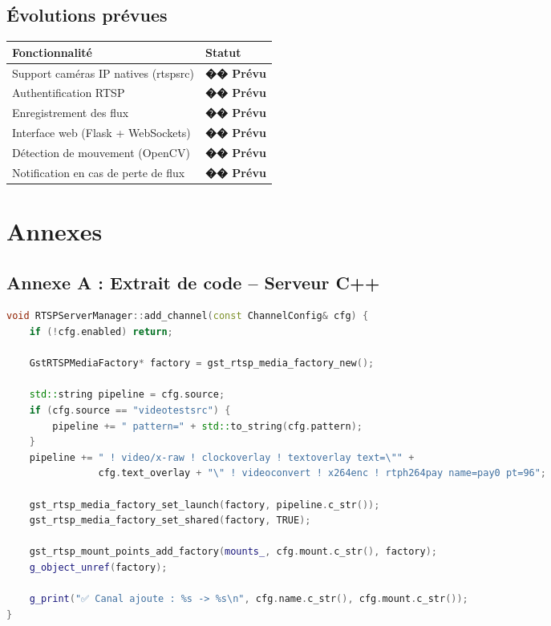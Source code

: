 \documentclass[12pt,a4paper]{report}
\newcommand{\warning}[1]{\textcolor{accentOrange}{\textbf{#1}}}
\begin{document}
\section{Évolutions prévues}

\begin{table}[H]
    \centering
    \begin{tabular}{|l|l|}
        \hline
        \rowcolor{primaryBlue!80}
        \color{white}\textbf{Fonctionnalité} & \color{white}\textbf{Statut} \\
        \hline
        Support caméras IP natives (rtspsrc) & \warning{�� Prévu} \\
        Authentification RTSP & \warning{�� Prévu} \\
        Enregistrement des flux & \warning{�� Prévu} \\
        Interface web (Flask + WebSockets) & \warning{�� Prévu} \\
        Détection de mouvement (OpenCV) & \warning{�� Prévu} \\
        Notification en cas de perte de flux & \warning{�� Prévu} \\
        \hline
    \end{tabular}
\end{table}

\chapter*{Annexes}

\section*{Annexe A : Extrait de code – Serveur C++}

\begin{lstlisting}[language=c++, caption=RTSPServerManager.cpp]
void RTSPServerManager::add_channel(const ChannelConfig& cfg) {
    if (!cfg.enabled) return;
    
    GstRTSPMediaFactory* factory = gst_rtsp_media_factory_new();
    
    std::string pipeline = cfg.source;
    if (cfg.source == "videotestsrc") {
        pipeline += " pattern=" + std::to_string(cfg.pattern);
    }
    pipeline += " ! video/x-raw ! clockoverlay ! textoverlay text=\"" + 
                cfg.text_overlay + "\" ! videoconvert ! x264enc ! rtph264pay name=pay0 pt=96";
    
    gst_rtsp_media_factory_set_launch(factory, pipeline.c_str());
    gst_rtsp_media_factory_set_shared(factory, TRUE);
    
    gst_rtsp_mount_points_add_factory(mounts_, cfg.mount.c_str(), factory);
    g_object_unref(factory);
    
    g_print("✅ Canal ajoute : %s -> %s\n", cfg.name.c_str(), cfg.mount.c_str());
}
\end{lstlisting}
\end{document}
